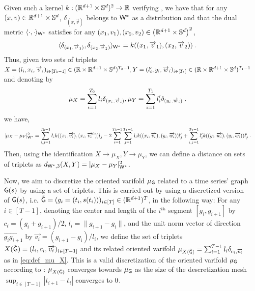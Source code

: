 Given such a kernel $k:(\mathbb{R}^{d+1} \times \mathbb{S}^d)^2\to \mathbb{R}$
verifying \citep[Proposition 2 \& 4]{kaltenmark2017general}, we have that for any $(x,v)\in \mathbb{R}^{d+1}\times \mathbb{S}^{d}$, $\delta_{(x,\overrightarrow{v})}$ belongs to $\mathsf{W}^*$ as a distribution and that the dual metric $\langle\cdot,\cdot \rangle_{\mathsf{W}^*} $ satisfies for any $(x_1,v_1),(x_2,v_2)\in \left(\mathbb{R}^{d+1}\times \mathbb{S}^{d}\right)^2$,
\begin{equation}
  \langle\delta_{(x_1,\overrightarrow{v}_1)},\delta_{(x_2,\overrightarrow{v}_2)} \rangle_{\mathsf{W}^*} =k((x_1,\overrightarrow{v}_1),(x_2,\overrightarrow{v}_2)) \; .
\end{equation}
Thus, given two sets of triplets $X=(l_i,x_i,\overrightarrow{v}_i)_{i\in[T_0-1]}\in (\mathbb{R}\times \mathbb{R}^{d+1}\times \mathbb{S}^d)^{T_0-1},Y=(l_i',y_i,\overrightarrow{w}_i)_{i\in[T_1]}\in (\mathbb{R}\times \mathbb{R}^{d+1}\times \mathbb{S}^d)^{T_1-1}$ and denoting by 
\begin{equation}
  \label{eq:def_mu_X}
  \mu_X=\sum_{i=1}^{T_0} l_i \delta_{(x_i,\overrightarrow{v}_i)},\mu_Y=\sum_{i=1}^{T_1} l_i' \delta_{(y_i,\overrightarrow{w}_i)} \;,
\end{equation}
 we have,
\begin{equation}
   |\mu_X-\mu_Y |_{\mathsf{W}^*}^2 = \sum_{i,j = 1}^{T_0-1}l_i k((x_i,\overrightarrow{v_i}),(x_i,\overrightarrow{v_i}^0))l_j - 2 \sum_{i=1}^{T_0-1}\sum_{j=1}^{T_1-1}l_i k((x_i,\overrightarrow{v_i}),(y_i,\overrightarrow{w_i}))l_j' + \sum_{i,j = 1}^{T_1-1}l_i' k((y_i,\overrightarrow{w_i}),(y_i,\overrightarrow{w_i}))l_j' \;.
\end{equation}
Then, using the identification $X\to \mu_X, Y\to \mu_Y$, we can define a distance on sets of triplets as $d_{\mathsf{W}^*,3}(X,Y)=|\mu_X-\mu_Y|_{\mathsf{W}^*}^2$.

Now, we aim to discretize the oriented varifold $\mu_{\mathsf{G}} $ related to a time series' graph $\mathsf{G}(s)$ by using a set of triplets.
This is carried out by using a discretized version of $\mathsf{G}(s) $, i.e. $\tilde{\mathsf{G}}=(g_i=(t_i,s(t_i)))_{i\in[T]}\in(\mathbb{R}^{d+1})^T$, in the following way: 
For any  $i\in[T-1]$, denoting the center and length of the $i^{th}$ segment $[g_i,g_{i+1}]$ by
$c_i = (g_i + g_{i+1})/2$, $l_i = \| g_{i+1}-g_{i}\|$, and the unit norm vector of direction $\overrightarrow{g_i g_{i+1}}$ by
 $\overrightarrow{v_i} = (g_{i+1}-g_{i})/l_i$, we define the set of triplets $X(\tilde{\mathsf{G}})=(l_i,c_i,\overrightarrow{v_i})_{i\in[T-1]}$ and its related oriented varifold $\mu_{X(\tilde{\mathsf{G}})}= \sum_{i=1}^{T-1}l_i \delta_{c_i,\overrightarrow{v_i}}$ as in \eqref{eq:def_mu_X}.
 This is a valid discretization of the oriented varifold $\mu_{\mathsf{G}}$ according to \citep[Proposition 1]{kaltenmark2017general}: $\mu_{X(\tilde{\mathsf{G}})}$ converges towards $\mu_{\mathsf{G}}$ as the size of the descretization mesh $\sup_{i\in[T-1]} |t_{i+1}-t_i| $ converges to 0.

